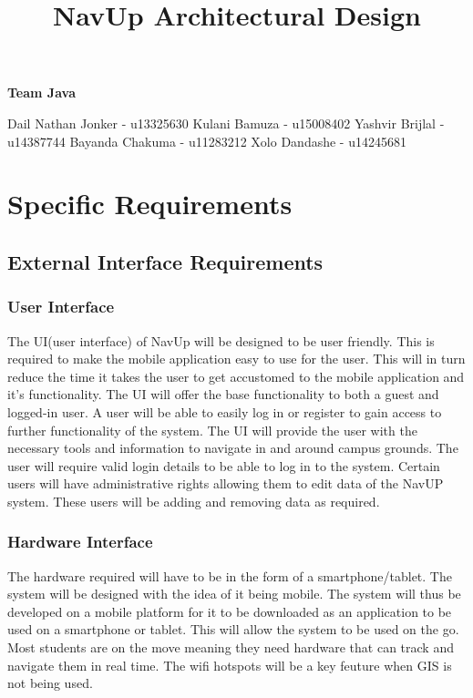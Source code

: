 \documentclass{article}
\begin{document}
\title{NavUp Architectural Design}
\maketitle
		\begin{center}
			\textbf{\newline Team Java} \\
		\end{center}
		
		\begin{flushright} \large
			Dail Nathan Jonker - u13325630 \newline
			Kulani Bamuza - u15008402 \newline
			Yashvir Brijlal - u14387744 \newline
			Bayanda Chakuma - u11283212 \newline
			Xolo Dandashe - u14245681 \newline     
		\end{flushright}
\clearpage
\tableofcontents
	
\clearpage
\section{Specific Requirements}
	\subsection{External Interface Requirements}
		\subsubsection{User Interface}
The UI(user interface) of NavUp will be designed to be user friendly. This is required to make the mobile application easy to use for the user. This will in turn reduce the time it takes the user to get accustomed to the mobile application and it's functionality. The UI will offer the base functionality to both a guest and logged-in user. A user will be able to easily log in or register to gain access to further functionality of the system. The UI will provide the user with the necessary tools and information to navigate in and around campus grounds. The user will require valid login details to be able to log in to the system. Certain users will have administrative rights allowing them to edit data of the NavUP system. These users will be adding and removing data as required.

		\subsubsection{Hardware Interface}
The hardware required will have to be in the form of a smartphone/tablet. The system will be designed with the idea of it being mobile. The system will thus be developed on a mobile platform for it to be downloaded as an application to be used on a smartphone or tablet. This will allow the system to be used on the go. Most students are on the move meaning they need hardware that can track and navigate them in real time. The wifi hotspots will be a key feuture when GIS is not being used.
\end{document}
